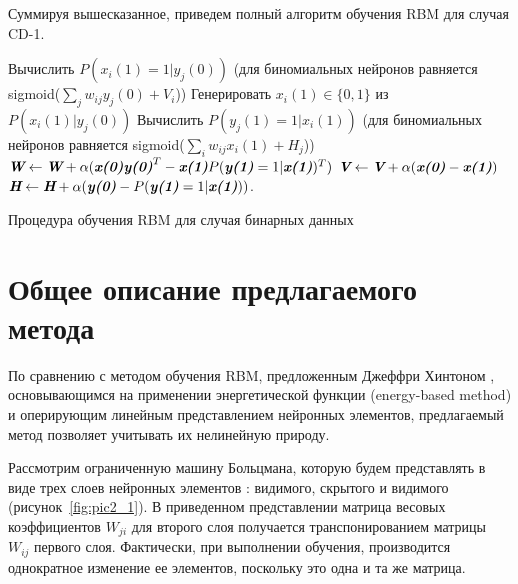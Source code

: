 Суммируя вышесказанное, приведем полный алгоритм обучения RBM для случая CD-1.

\begin{algo}[h]
	
	{
		Вычислить $P(x_{i}(1)=1|y_j(0))$ (для биномиальных нейронов равняется sigmoid($\sum_{j}{w_{ij}y_{j}(0)} + V_i$))\;
		Генерировать $x_{i}(1) \in \{0, 1\}$ из $P(x_{i}(1)|y_j(0))$\;
	}	
	{
		Вычислить $P(y_{j}(1)=1|x_i(1))$ (для биномиальных нейронов равняется sigmoid($\sum_{i}{w_{ij}x_{i}(1)} + H_j$))\;
	}
	$\textit{\textbf{W}} \leftarrow \textit{\textbf{W}} + \alpha(\textbf{\textit{x(0)}}\textit{\textbf{y(0)}}^T - \textit{\textbf{x(1)}}P(\textit{\textbf{y(1)}}=1|\textit{\textbf{x(1)}})^T)$\;
	$\textit{\textbf{V}} \leftarrow \textit{\textbf{V}} + \alpha(\textit{\textbf{x(0)}} - \textit{\textbf{x(1)}})$\;
	$\textit{\textbf{H}} \leftarrow \textit{\textbf{H}} + \alpha(\textit{\textbf{y(0)}} - P(\textit{\textbf{y(1)}}=1|\textit{\textbf{x(1)}}))$.
    \caption{Процедура обучения RBM для случая бинарных данных}
\end{algo}

\section{Общее описание предлагаемого метода}

По сравнению с методом обучения RBM, предложенным Джеффри Хинтоном \cite[c.~3]{hinton2010}, основывающимся на применении энергетической функции (energy-based method) и оперирующим линейным представлением нейронных элементов, предлагаемый метод позволяет учитывать их нелинейную природу. 
 
Рассмотрим ограниченную машину Больцмана, которую будем представлять в виде трех слоев нейронных элементов \cite[c.~131]{4-A}: видимого, скрытого и видимого (рисунок~\ref{fig:pic2_1}). В приведенном представлении матрица весовых коэффициентов $W_{ji}$ для второго слоя получается транспонированием матрицы $W_{ij}$ первого слоя. Фактически, при выполнении обучения, производится однократное изменение ее элементов, поскольку это одна и та же матрица.

